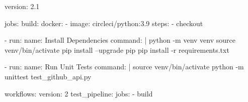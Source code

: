 version: 2.1

jobs:
  build:
    docker:
      - image: circleci/python:3.9
    steps:
      - checkout

      - run:
          name: Install Dependencies
          command: |
            python -m venv venv
            source venv/bin/activate
            pip install --upgrade pip
            pip install -r requirements.txt

      - run:
          name: Run Unit Tests
          command: |
            source venv/bin/activate
            python -m unittest test_github_api.py

workflows:
  version: 2
  test_pipeline:
    jobs:
      - build


